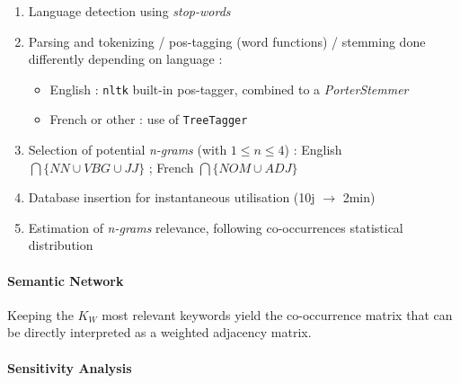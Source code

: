 \begin{enumerate}
\item Language detection using \textit{stop-words}
\item Parsing and tokenizing / pos-tagging (word functions) / stemming done differently depending on language :
\begin{itemize}
\item English : \texttt{nltk} built-in pos-tagger, combined to a \emph{PorterStemmer}
\item French or other : use of \texttt{TreeTagger}~\cite{schmid1994probabilistic}
\end{itemize}
\item Selection of potential \textit{n-grams} (with $1 \leq n \leq 4$) : English $\bigcap \{NN \cup VBG \cup JJ \}$ ;  French  $\bigcap \{NOM \cup ADJ\}$
\item Database insertion for instantaneous utilisation (10j $\rightarrow$ 2min)
\item Estimation of \textit{n-grams} relevance, following co-occurrences statistical distribution
\end{enumerate}



\paragraph{Semantic Network}





Keeping the $K_W$ most relevant keywords yield the co-occurrence matrix that can be directly interpreted as a weighted adjacency matrix. 








\paragraph{Sensitivity Analysis}



